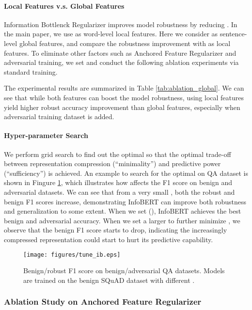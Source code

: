 \documentclass{article} \usepackage{iclr2021_conference,times}
\theoremstyle{definition}
\theoremstyle{remark}
\newcommand{\method}{InfoBERT\xspace}
\begin{document}
\paragraph{Local Features v.s. Global Features} Information Bottlenck Regularizer improves model robustness by reducing . In the main paper, we use  as word-level local features. Here we consider  as sentence-level global features, and compare the robustness improvement with  as local features. To eliminate other factors such as Anchored Feature Regularizer and adversarial training, we set  and conduct the following ablation experiments via standard training. 

The experimental results are summarized in Table \ref{tab:ablation_global}. We can see that while both features can boost the model robustness, using local features yield higher robust accuracy improvement than global features, especially when adversarial training dataset is added. 

\paragraph{Hyper-parameter Search} We perform grid search to find out the optimal  so that the optimal trade-off between representation compression (``minimality'') and predictive power (``sufficiency'') is achieved. An example to search for the optimal  on QA dataset is shown in Fingure \ref{fig:ablation_beta}, which illustrates how  affects the F1 score on benign and adversarial datasets. We can see that from a very small , both the robust and benign F1 scores increase, demonstrating \method can improve both robustness and generalization to some extent. When we set  (), \method achieves the best benign and adversarial accuracy. When we set a larger  to further minimize , we observe that the benign F1 score starts to drop, indicating the increasingly compressed representation could start to hurt its predictive capability.
\begin{figure}[t]
    \centering
    \texttt{[image: figures/tune\_ib.eps]}
    \caption{Benign/robust F1 score on benign/adversarial QA datasets. Models are trained on the benign SQuAD dataset with different .}
    \label{fig:ablation_beta}
\end{figure}


\subsubsection{Ablation Study on Anchored Feature Regularizer}
\end{document}
